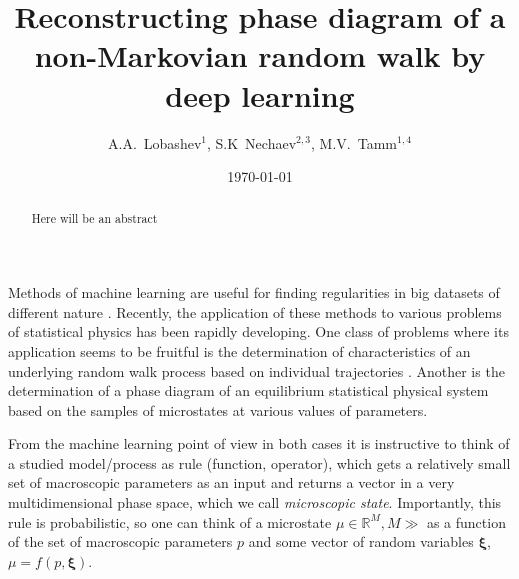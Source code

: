 \documentclass[aps,a4paper,twocolumn,showpacs]{revtex4}
\begin{document}
\title{Reconstructing phase diagram of a non-Markovian random walk by deep learning}


\author{A.A.~Lobashev$^{1}$, S.K~Nechaev$^{2,3}$, M.V.~Tamm$^{1,4}$}


\date{\today}

\begin{abstract}
Here will be an abstract
\end{abstract}


\maketitle

Methods of machine learning are useful for finding regularities in big datasets of different nature \cite{???}. Recently, the application of these methods to various problems of statistical physics has been rapidly developing. One class of problems where its application seems to be fruitful is the determination of characteristics of an underlying random walk process based on individual trajectories \cite{...}. Another is the determination of a phase diagram of an equilibrium statistical physical system based on the samples of microstates at various values of parameters\cite{?}. 

From the machine learning point of view in both cases it is instructive to think of a studied model/process as rule (function, operator), which gets a relatively small set of macroscopic parameters as an input and returns a vector in a very multidimensional phase space, which we call \emph {microscopic state}. Importantly, this rule is probabilistic, so one can think of a microstate $\mu \in \mathbb{R}^M, M \gg$ as a function of the set of macroscopic parameters $p$ and some vector of random variables $\boldsymbol{\xi}$, $\mu = f(p,\boldsymbol{\xi})$.
\end{document}
